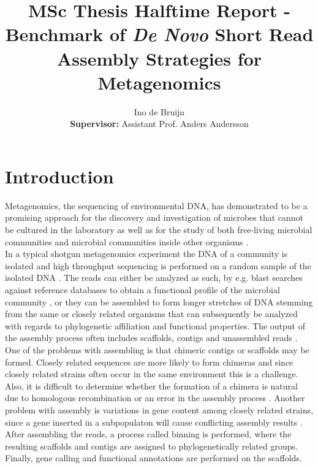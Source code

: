 \documentclass[a4paper,12pt]{article}
\begin{document}
\title{MSc Thesis Halftime Report - Benchmark of {\em De Novo} Short Read
Assembly Strategies for Metagenomics}
\author{Ino de Bruijn\\ {\bf Supervisor:} Assistant Prof. Anders Andersson}

\maketitle

\section{Introduction}
Metagenomics, the sequencing of environmental DNA, has demonstrated to be a
promising approach for the discovery and investigation of microbes that cannot
be cultured in the laboratory \cite{Eisen17355177} as well as for the study of
both free-living microbial communities \cite{Andersson18497291} and microbial
communities inside other organisms \cite{Qin20203603,Hess21273488}.\\


In a typical shotgun metagenomics experiment the DNA of a community is isolated
and high throughput sequencing is performed on a random sample of the isolated
DNA \cite{Morgan20419134}. The reads can either be analyzed as such, by e.g.
blast searches against reference databases to obtain a functional profile of
the microbial community \cite{Tringe15845853}, or they can be assembled to form
longer stretches of DNA stemming from the same or closely related organisms
that can subsequently be analyzed with regards to phylogenetic affiliation and
functional properties. The output of the assembly process often includes
scaffolds, contigs and unassembled reads \cite{Mavromatis17468765}. One of the
problems with assembling is that chimeric contigs or scaffolds may be formed.
Closely related sequences are more likely to form chimeras and since closely
related strains often occur in the same environment this is a challenge. Also,
it is difficult to determine whether the formation of a chimera is natural due
to homologous recombination or an error in the assembly process
\cite{Tyson14961025}. Another problem with assembly is variations in gene
content among closely related strains, since a gene inserted in a subpopulaton
will cause conflicting assembly results \cite{Hallam17114289}. After assembling
the reads, a process called binning is performed, where the resulting scaffolds
and contigs are assigned to phylogenetically related groups. Finally, gene
calling and functional annotations are performed on the scaffolds.\\
\end{document}
